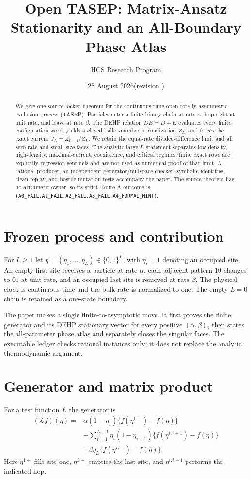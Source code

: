 \documentclass[11pt]{article}
\title{Open TASEP: Matrix-Ansatz Stationarity and an All-Boundary Phase Atlas}
\author{HCS Research Program}
\date{28 August 2026\quad (revision \CRevisionRound)}
\begin{document}
\maketitle
\begin{abstract}
We give one source-locked theorem for the continuous-time open totally
asymmetric exclusion process (TASEP).  Particles enter a finite binary chain
at rate $\alpha$, hop right at unit rate, and leave at rate $\beta$.  The
DEHP relation $DE=D+E$ evaluates every finite configuration word, yields a
closed ballot-number normalization $Z_L$, and forces the exact current
$J_L=Z_{L-1}/Z_L$.  We retain the equal-rate divided-difference limit and
all zero-rate and small-size faces.  The analytic large-$L$ statement
separates low-density, high-density, maximal-current, coexistence, and
critical regimes; finite exact rows are explicitly regression sentinels and
are not used as numerical proof of that limit.  A rational producer, an
independent generator/nullspace checker, symbolic identities, clean replay,
and hostile mutation tests accompany the paper.  The source theorem has no
arithmetic owner, so its strict Route-A outcome is
\texttt{(A0\_FAIL,A1\_FAIL,A2\_FAIL,A3\_FAIL,A4\_FORMAL\_HINT)}.
\end{abstract}

\section{Frozen process and contribution}
For $L\geq 1$ let $\eta=(\eta_1,\ldots,\eta_L)\in\{0,1\}^L$, with
$\eta_i=1$ denoting an occupied site.  An empty first site receives a
particle at rate $\alpha$, each adjacent pattern $10$ changes to $01$ at
unit rate, and an occupied last site is removed at rate $\beta$.  The
physical clock is continuous time and the bulk rate is normalized to one.
The empty $L=0$ chain is retained as a one-state boundary.

The paper makes a single finite-to-asymptotic move.  It first proves the
finite generator and its DEHP stationary vector for every positive
$(\alpha,\beta)$, then states the all-parameter phase atlas and separately
closes the singular faces.  The executable ledger checks rational
instances only; it does not replace the analytic thermodynamic argument.

\section{Generator and matrix product}
For a test function $f$, the generator is
\begin{align}
(\mathcal Lf)(\eta)
={}&\alpha(1-\eta_1)\{f(\eta^{1+})-f(\eta)\}\nonumber\\
&+\sum_{i=1}^{L-1}\eta_i(1-\eta_{i+1})
 \{f(\eta^{i,i+1})-f(\eta)\}\nonumber\\
&+\beta\eta_L\{f(\eta^{L-})-f(\eta)\}.
\label{eq:generator}
\end{align}
Here $\eta^{1+}$ fills site one, $\eta^{L-}$ empties the last site, and
$\eta^{i,i+1}$ performs the indicated hop.
\end{document}
